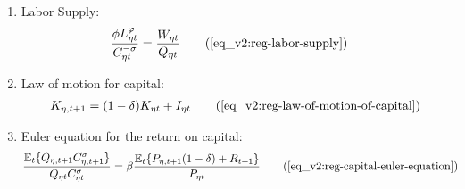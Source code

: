 \documentclass[../thesis.tex]{subfiles}
\begin{document}
{\begin{itemize}
\begin{enumerate}
\begin{comment}
		\begin{align}
			Q_{1t} &= \left( \frac{P_{1 t}}{\omega_{11}} \right)^{\omega_{11}} \left( \frac{P_{2 t}}{1 -\omega_{11}} \right)^{1 -\omega_{11}} \tag{\ref{eq_v2:reg-total-expense-level}}
		\end{align}

		\begin{align}
			\frac{Q_{1t}}{Q_{2t}} &= \frac{\omega_{21}^{\omega_{21}} (1 -\omega_{21})^{1 -\omega_{21}}}{\omega_{11}^{\omega_{11}} (1 - \omega_{11})^{1 - \omega_{11}}} \tag{\ref{eq_v2:reg-total-expense-level-2}}
		\end{align}
	
\end{comment}
		
		\item Labor Supply:
			\begin{align}
				\frac{\phi L_{\eta t}^{\varphi}}{C_{\eta t}^{-\sigma}} &= \frac{W_{\eta t}}{Q_{\eta t}} \tag{\ref{eq_v2:reg-labor-supply}}
			\end{align}
		
		\item Law of motion for capital:
		\begin{align}
			K_{\eta,t+1} = (1 - \delta) K_{\eta t} + I_{\eta t} \tag{\ref{eq_v2:reg-law-of-motion-of-capital}}
		\end{align}		

		\item Euler equation for the return on capital:
		\begin{align}
			\frac{\mathbb{E}_{t} \{ Q_{\eta,t+1} C_{\eta,t+1}^{\sigma} \} }{ Q_{\eta t} C_{\eta t}^{\sigma} } &= \beta \frac{ \mathbb{E}_{t} \{ P_{\eta,t+1} (1 - \delta) + R_{t+1} \} }{P_{\eta t}} \tag{\ref{eq_v2:reg-capital-euler-equation}}
		\end{align}

		\begin{comment}

			\item Region 1 Euler equation for the bonds return:
			\begin{align}
				\frac{\mathbb{E}_{t} \left\{Q_{1, t+1} C_{1, t+1}^{\sigma} \right\}}{Q_{1t} C_{1t}^{\sigma}} &= \beta (1 + R_{t}) \tag{\ref{eq_v2:reg-capital-euler-equation}}
			\end{align}
			
			\item Euler equation for regional consumption:
			\begin{align}
				\frac{\mathbb{E}_{t} \left\{ Q_{1, t+1} C_{1, t+1}^{\sigma} \right\}}{Q_{1t} C_{1t}^{\sigma}} &= \frac{\mathbb{E}_{t} \left\{ Q_{2, t+1} C_{2, t+1}^{\sigma} \right\}}{Q_{2t} C_{2t}^{\sigma}} \tag{\ref{eq_v2:reg-bonds-euler-equation-2}}
			\end{align}
			

\end{comment}
\end{enumerate}
\end{itemize}}
\end{document}
